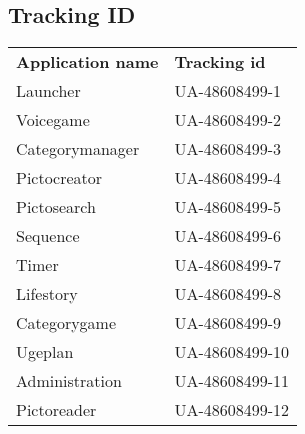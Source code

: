 \subsection{Tracking ID}
\begin{table}[h]
	\begin{tabular}{ll}
		\textbf{Application name} & \textbf{Tracking id}    \\
		Launcher         & UA-48608499-1  \\
		Voicegame        & UA-48608499-2  \\
		Categorymanager  & UA-48608499-3  \\
		Pictocreator     & UA-48608499-4  \\
		Pictosearch      & UA-48608499-5  \\
		Sequence         & UA-48608499-6  \\
		Timer            & UA-48608499-7  \\
		Lifestory        & UA-48608499-8  \\
		Categorygame     & UA-48608499-9  \\
		Ugeplan          & UA-48608499-10 \\
		Administration   & UA-48608499-11 \\
		Pictoreader      & UA-48608499-12
	\end{tabular}
\end{table}